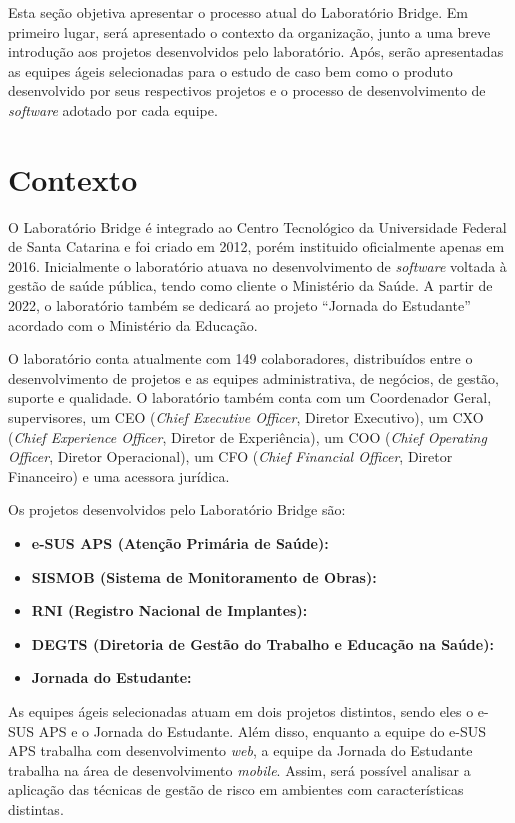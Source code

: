 \documentclass[
    12pt,       %
    openright,      %
    twoside,      %
    a4paper,      %
    english,      %
    french,       %
    spanish,      %
    brazil,       %
    ]{abntex2}
\begin{document}
Esta seção objetiva apresentar o processo atual do Laboratório Bridge. Em primeiro lugar, será apresentado o contexto da organização, junto a uma breve introdução aos projetos desenvolvidos pelo laboratório. Após, serão apresentadas as equipes ágeis selecionadas para o estudo de caso bem como o produto desenvolvido por seus respectivos projetos e o processo de desenvolvimento de \textit{software} adotado por cada equipe.

\label{sec:Processo}
\section{Contexto}

O Laboratório Bridge é integrado ao Centro Tecnológico da Universidade Federal de Santa Catarina e foi criado em 2012, porém instituido oficialmente apenas em 2016. Inicialmente o laboratório atuava no desenvolvimento de \textit{software} voltada à gestão de saúde pública, tendo como cliente o Ministério da Saúde. A partir de 2022, o laboratório também se dedicará ao projeto ``Jornada do Estudante'' acordado com o Ministério da Educação.

O laboratório conta atualmente com 149 colaboradores, distribuídos entre o desenvolvimento de projetos e as equipes administrativa, de negócios, de gestão, suporte e qualidade. O laboratório também conta com um Coordenador Geral, supervisores, um CEO (\textit{Chief Executive Officer}, Diretor Executivo), um CXO (\textit{Chief Experience Officer}, Diretor de Experiência), um COO (\textit{Chief Operating Officer}, Diretor Operacional), um CFO (\textit{Chief Financial Officer}, Diretor Financeiro) e uma acessora jurídica.

Os projetos desenvolvidos pelo Laboratório Bridge são:
\begin{itemize}
    \item \textbf{e-SUS APS (Atenção Primária de Saúde):}
    \item \textbf{SISMOB (Sistema de Monitoramento de Obras):}
    \item \textbf{RNI (Registro Nacional de Implantes):}
    \item \textbf{DEGTS (Diretoria de Gestão do Trabalho e Educação na Saúde):}
    \item \textbf{Jornada do Estudante:}
\end{itemize}

As equipes ágeis selecionadas atuam em dois projetos distintos, sendo eles o e-SUS APS e o Jornada do Estudante. Além disso, enquanto a equipe do e-SUS APS trabalha com desenvolvimento \textit{web}, a equipe da Jornada do Estudante trabalha na área de desenvolvimento \textit{mobile}. Assim, será possível analisar a aplicação das técnicas de gestão de risco em ambientes com características distintas.
\end{document}
